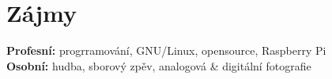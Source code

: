 \documentclass[]{friggeri-cv} %
\begin{document}

\section{Zájmy}

\textbf{Profesní:} progrramování, GNU/Linux, opensource, Raspberry Pi
\\
\textbf{Osobní:} hudba, sborový zpěv, analogová \& digitální fotografie

\end{document}
